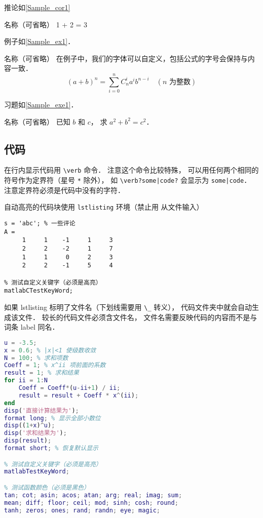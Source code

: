 推论如\autoref{Sample_cor1}
\begin{corollary}{名称（可省略）}\label{Sample_cor1}
1 + 2 = 3
\end{corollary}

例子如\autoref{Sample_ex1}． 
\begin{example}{名称（可省略）}\label{Sample_ex1}
在例子中，我们的字体可以自定义，包括公式的字号会保持与内容一致．
\begin{equation}
(a+b)^n = \sum_{i=0}^n C_n^i a^i b^{n-i} \quad (\text{$n$ 为整数})
\end{equation}
\end{example}

习题如\autoref{Sample_exe1}． 
\begin{exercise}{名称（可省略）}\label{Sample_exe1}
已知 $b$ 和 $c$， 求 $a^2 + b^2 = c^2$．
\end{exercise}

\subsection{代码}
在行内显示代码用 \verb|\verb| 命令． 注意这个命令比较特殊， 可以用任何两个相同的符号作为定界符（星号 \verb|*| 除外）， 如 \verb+\verb?some|code?+ 会显示为 \verb?some|code?． 注意定界符必须是代码中没有的字符．

自动高亮的代码块使用 \verb|lstlisting| 环境（禁止用 \verb|| 从文件输入）
\begin{lstlisting}[language=matlabC]
s = 'abc'; % 一些评论
A =
     1     1    -1     1     3
     2     2    -2     1     7
     1     1     0     2     3
     2     2    -1     5     4

% 测试自定义关键字（必须是高亮）
matlabCTestKeyWord;
\end{lstlisting}

如果 lstlisting 标明了文件名（下划线需要用 \verb|\_| 转义）， 代码文件夹中就会自动生成该文件． 较长的代码文件必须含文件名， 文件名需要反映代码的内容而不是与词条 label 同名．

\begin{lstlisting}[language=matlab, caption=sample\_code.m]
% 验证二项式定理(非整数幂)
u = -3.5;
x = 0.6; % |x|<1 使级数收敛
N = 100; % 求和项数
Coeff = 1; % x^ii 项前面的系数
result = 1; % 求和结果
for ii = 1:N
    Coeff = Coeff*(u-ii+1) / ii;
    result = result + Coeff * x^(ii);
end
disp('直接计算结果为');
format long; % 显示全部小数位
disp((1+x)^u);
disp('求和结果为');
disp(result);
format short; % 恢复默认显示

% 测试自定义关键字（必须是高亮）
matlabTestKeyWord;

% 测试函数颜色（必须是黑色）
tan; cot; asin; acos; atan; arg; real; imag; sum;
mean; diff; floor; ceil; mod; sinh; cosh; round;
tanh; zeros; ones; rand; randn; eye; magic;
\end{lstlisting}

